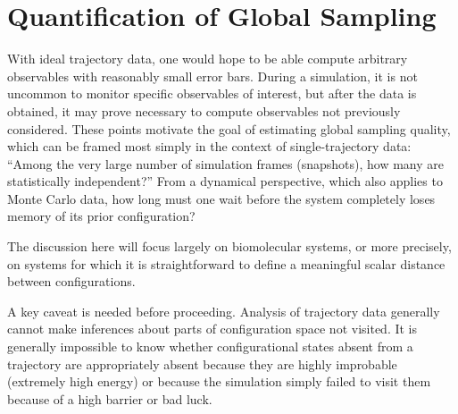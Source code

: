 \section{Quantification of Global Sampling}

With ideal trajectory data, one would hope to be able compute arbitrary observables with reasonably small error bars.
During a simulation, it is not uncommon to monitor specific observables of interest, but after the data is obtained, it may prove necessary to compute observables not previously considered.
These points motivate the goal of estimating global sampling quality, which can be framed most simply in the context of single-trajectory data:
``Among the very large number of simulation frames (snapshots), how many are statistically independent?''  
From a dynamical perspective, which also applies to Monte Carlo data, how long must one wait before the system completely loses memory of its prior configuration?

The discussion here will focus largely on biomolecular systems, or more precisely, on systems for which it is straightforward to define a meaningful scalar distance between configurations.

A key caveat is needed before proceeding.  
Analysis of trajectory data generally cannot make inferences about parts of configuration space not visited.
It is generally impossible to know whether configurational states absent from a trajectory are appropriately absent because they are highly improbable (extremely high energy) or because the simulation simply failed to visit them because of a high barrier or bad luck.


